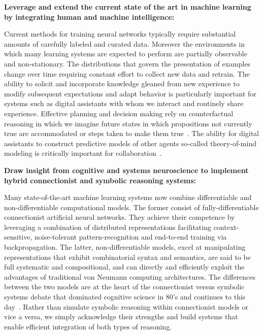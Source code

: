 
{\bf{Leverage and extend the current state of the art in machine learning by integrating human and machine intelligence:}}

Current methods for training neural networks typically require substantial amounts of carefully labeled and curated data. Moreover the environments in which many learning systems are expected to perform are partially observable and non-stationary. The distributions that govern the presentation of examples change over time requiring constant effort to collect new data and retrain. The ability to solicit and incorporate knowledge gleaned from new experience to modify subsequent expectations and adapt behavior is particularly important for systems such as digital assistants with whom we interact and routinely share experience. Effective planning and decision making rely on counterfactual reasoning in which we imagine future states in which propositions not currently true are accommodated or steps taken to make them true~\cite{HassabisandMaguireTiCS-07}. The ability for digital assistants to construct predictive models of other agents \emdash{} so-called theory-of-mind modeling \emdash{} is critically important for collaboration~\cite{RabinowitzetalCoRR-18}.


{\bf{Draw insight from cognitive and systems neuroscience to implement hybrid connectionist and symbolic reasoning systems:}}

Many state-of-the-art machine learning systems now combine differentiable and non-differentiable computational models. The former consist of fully-differentiable connectionist artificial neural networks. They achieve their competence by leveraging a combination of distributed representations facilitating context-sensitive, noise-tolerant pattern-recognition and end-to-end training via backpropagation. The latter, non-differentiable models, excel at manipulating representations that exhibit combinatorial syntax and semantics, are said to be full systematic and compositional, and can directly and efficiently exploit the advantages of traditional von Neumann computing architectures. The differences between the two models are at the heart of the connectionist versus symbolic systems debate that dominated cognitive science in 80's and continues to this day~\cite{OReillyetalTACO-14,FodorandPylyshynCOGNITION-88}. Rather than simulate symbolic reasoning within connectionist models or vice a versa, we simply acknowledge their strengths and build systems that enable efficient integration of both types of reasoning.

